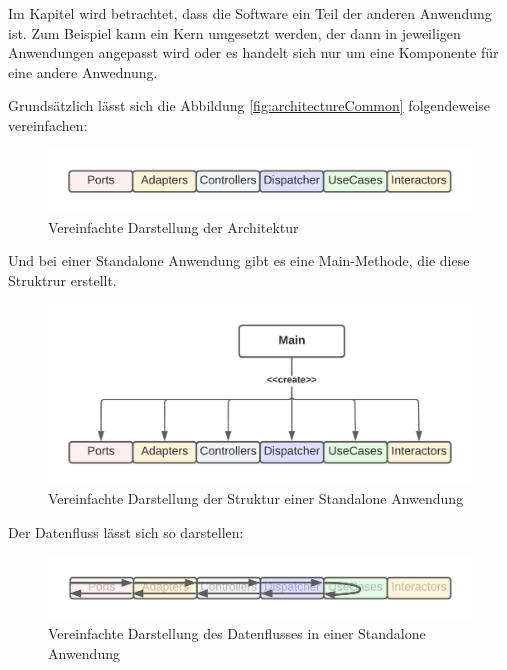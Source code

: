 Im Kapitel wird betrachtet, dass die Software ein Teil der anderen Anwendung ist.
Zum Beispiel kann ein Kern umgesetzt werden, der dann in jeweiligen Anwendungen angepasst wird 
oder es handelt sich nur um eine Komponente für eine andere Anwednung.

Grundsätzlich lässt sich die Abbildung \ref{fig:architectureCommon} folgendeweise vereinfachen:
\begin{figure}[H]
    \centering
    \includegraphics[width=1\textwidth]{./images/SimpliedArchitecture.png}
    \caption{Vereinfachte Darstellung der Architektur}
    \label{fig:SimpliedArchitecture}
\end{figure}

Und bei einer Standalone Anwendung gibt es eine Main-Methode, die diese Struktrur erstellt.
\begin{figure}[H]
    \centering
    \includegraphics[width=1\textwidth]{./images/Architecture as Standalone.png}
    \caption{Vereinfachte Darstellung der Struktur einer Standalone Anwendung}
    \label{fig:SimpliedArchitectureAsStandalone}
\end{figure}

Der Datenfluss lässt sich so darstellen:
\begin{figure}[H]
    \centering
    \includegraphics[width=1\textwidth]{./images/Dataflow.png}
    \caption{Vereinfachte Darstellung des Datenflusses in einer Standalone Anwendung}
    \label{fig:SimpliedArchitectureDataflow}
\end{figure}

